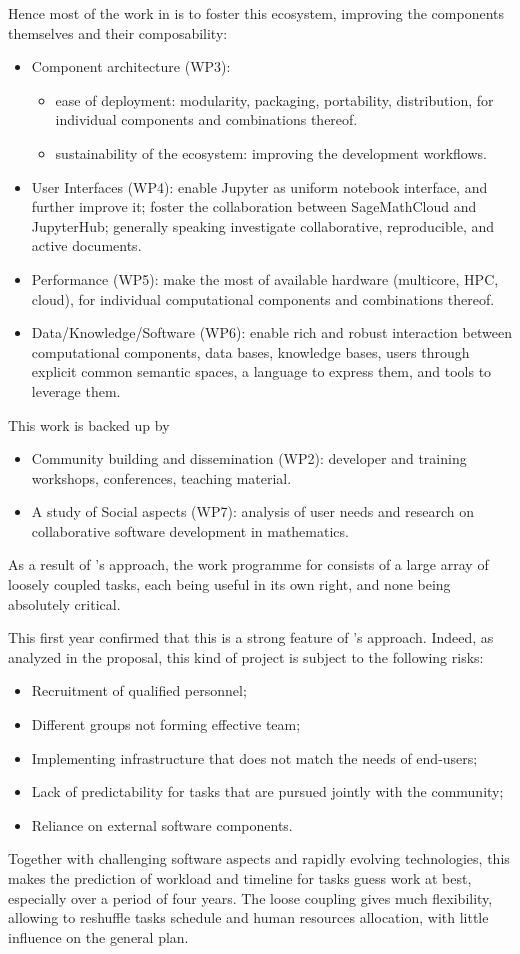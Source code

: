 \documentclass{deliverablereport}
\begin{document}
Hence most of the work in \ODK is to foster this ecosystem, improving
the components themselves and their composability:
\begin{itemize}
\item Component architecture (WP3):
  \begin{itemize}
  \item ease of deployment: modularity, packaging, portability,
    distribution, for individual components and combinations thereof.
  \item sustainability of the ecosystem: improving the development workflows.
  \end{itemize}
\item User Interfaces (WP4): enable Jupyter as uniform notebook
  interface, and further improve it; foster the collaboration between
  SageMathCloud and JupyterHub; generally speaking investigate
  collaborative, reproducible, and active documents.
\item Performance (WP5): make the most of available hardware
  (multicore, HPC, cloud), for individual computational components and
  combinations thereof.
\item Data/Knowledge/Software (WP6): enable rich and robust
  interaction between computational components, data bases, knowledge
  bases, users through explicit common semantic spaces, a language to
  express them, and tools to leverage them.
\end{itemize}
This work is backed up by
\begin{itemize}
\item Community building and dissemination (WP2): developer and
  training workshops, conferences, teaching material.
\item A study of Social aspects (WP7): analysis of user needs and
  research on collaborative software development in mathematics.
\end{itemize}

As a result of \ODK's approach, the work programme for \ODK consists
of a large array of loosely coupled tasks, each being useful in its
own right, and none being absolutely critical.

This first year confirmed that this is a strong feature of \ODK's
approach. Indeed, as analyzed in the proposal, this kind of project is
subject to the following risks:
\begin{itemize}
\item Recruitment of qualified personnel;
\item Different groups not forming effective team;
\item Implementing infrastructure that does not match the needs of end-users;
\item Lack of predictability for tasks that are pursued jointly with
  the community;
\item Reliance on external software components.
\end{itemize}
Together with challenging software aspects and rapidly evolving
technologies, this makes the prediction of workload and timeline for
tasks guess work at best, especially over a period of four years. The
loose coupling gives much flexibility, allowing to reshuffle tasks
schedule and human resources allocation, with little influence on the
general plan.
\end{document}

